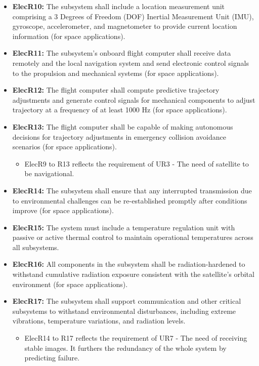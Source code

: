 \begin{itemize}
    \item \textbf{ElecR10:}
    The subsystem shall include a location measurement unit comprising a 3 Degrees of Freedom (DOF) Inertial Measurement Unit (IMU), gyroscope, accelerometer, and magnetometer to provide current location information (for space applications).

    \item \textbf{ElecR11:}
    The subsystem’s onboard flight computer shall receive data remotely and the local navigation system and send electronic control signals to the propulsion and mechanical systems (for space applications).
    
    \item \textbf{ElecR12:}
    The flight computer shall compute predictive trajectory adjustments and generate control signals for mechanical components to adjust trajectory at a frequency of at least 1000 Hz (for space applications).
    
    \item \textbf{ElecR13:}
    The flight computer shall be capable of making autonomous decisions for trajectory adjustments in emergency collision avoidance scenarios (for space applications).
     \begin{itemize}
        \item ElecR9 to R13 reflects the requirement of UR3 - The need of satellite to be navigational. 
    \end{itemize}

    \item \textbf{ElecR14:}
    The subsystem shall ensure that any interrupted transmission due to environmental challenges can be re-established promptly after conditions improve (for space applications).

    \item \textbf{ElecR15:}
    The system must include a temperature regulation unit with passive or active thermal control to maintain operational temperatures across all subsystems.

    \item \textbf{ElecR16:}
    All components in the subsystem shall be radiation-hardened to withstand cumulative radiation exposure consistent with the satellite’s orbital environment (for space applications).

    \item \textbf{ElecR17:}
    The subsystem shall support communication and other critical subsystems to withstand environmental disturbances, including extreme vibrations, temperature variations, and radiation levels.
     \begin{itemize}
        \item ElecR14 to R17 reflects the requirement of UR7 - The need of receiving stable images. It furthers the redundancy of the whole system by predicting failure. 
    \end{itemize}

    
\end{itemize}



